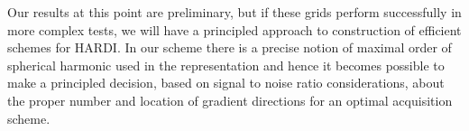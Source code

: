 \documentclass[landscape,a0b,final]{a0poster}
\newenvironment{poster}{
  \begin{center}
  \begin{minipage}[c]{0.98\textwidth}
}{
  \end{minipage} 
  \end{center}
}
\newcommand{\pbox}[4]{
\psshadowbox[#3]{
\begin{minipage}[t][#2][t]{#1}
#4
\end{minipage}
}}
\begin{document}
\begin{poster}
\begin{multicols}{3}
\begin{center}\pbox{0.8\columnwidth}{}{linewidth=2mm,framearc=0.1,linecolor=lightblue,fillstyle=gradient,gradangle=0,gradbegin=white,gradend=whiteblue,gradmidpoint=1.0,framesep=1em}{\begin{center}Conclusions\end{center}}\end{center}

Our results at this point are preliminary, but if these grids perform
successfully in more complex tests, we will have a principled approach to
construction of efficient schemes for HARDI. In our scheme there is a precise
notion of maximal order of spherical harmonic used in the representation and
hence it becomes possible to make a principled decision, based on signal to
noise ratio considerations, about the proper number and location of gradient
directions for an optimal acquisition scheme.






\end{multicols}

\end{poster}
\end{document}
